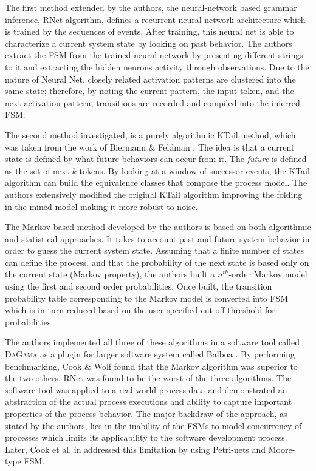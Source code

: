 \documentclass{sig-alternate}
\begin{document}
The first method extended by the authors, the neural-network based grammar inference, RNet algorithm, defines a recurrent neural network architecture which is trained by the sequences of events. After training, this neural net is able to characterize a current system state by looking on past behavior. The authors extract the FSM from the trained neural network by presenting different strings to it and extracting the hidden neurons activity through observations. Due to the nature of Neural Net, closely related activation patterns are clustered into the same state; therefore, by noting the current pattern, the input token, and the next activation pattern, transitions are recorded and compiled into the inferred FSM.

The second method investigated, is a purely algorithmic KTail method, which was taken from the work of Biermann \& Feldman \cite{citeulike:5120603}. The idea is that a current state is defined by what future behaviors can occur from it. The \textit{future} is defined as the set of next $k$ tokens. By looking at a window of successor events, the KTail algorithm can build the equivalence classes that compose the process model. The authors extensively modified the original KTail algorithm improving the folding in the mined model making it more robust to noise.

The Markov based method developed by the authors is based on both algorithmic and statistical approaches. It takes to account past and future system behavior in order to guess the current system state. Assuming that a finite number of states can define the process, and that the probability of the next state is based only on the current state (Markov property), the authors built a $n^{th}$-order Markov model using the first and second order probabilities. Once built, the transition probability table corresponding to the Markov model is converted into FSM which is in turn reduced based on the user-specified cut-off threshold for probabilities.

The authors implemented all three of these algorithms in a software tool called \textsc{DaGama} as a plugin for larger software system called Balboa \cite{citeulike:5120757}. By performing benchmarking, Cook \& Wolf found that the Markov algorithm was superior to the two others. RNet was found to be the worst of the three algorithms. The software tool was applied to a real-world process data and demonstrated an abstraction of the actual process executions and ability to capture important properties of the process behavior. The major backdraw of the approach, as stated by the authors, lies in the inability of the FSMs to model concurrency of processes which limits its applicability to the software development process. Later, Cook et al. in \cite{citeulike:5128143} addressed this limitation by using Petri-nets and Moore-type FSM.
\end{document}
